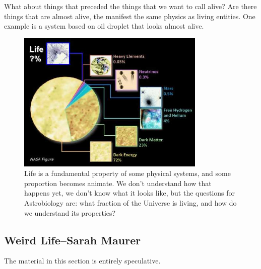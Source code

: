 \documentclass[]{article}
\begin{document}
What about things that preceded the things that we want to call alive? Are there things that are almost alive, the manifest the same physics as living entities. One example is a system based on oil droplet that looks almost alive.\cite{Points885}

\begin{figure}[H]
	\caption[What fraction of the Universe is living?]{Life is a fundamental property of some physical systems, and some proportion becomes animate. We don't understand how that happens yet, we don't know what it looks like, but the questions for Astrobiology are: what fraction of the Universe is living, and how do we understand its properties?}\label{figs:the-big-picture}
	\includegraphics[width=0.8\textwidth]{the-big-picture}
\end{figure}

\subsection[Weird Life]{Weird Life--Sarah Maurer}

The material in this section is entirely speculative.
\end{document}
